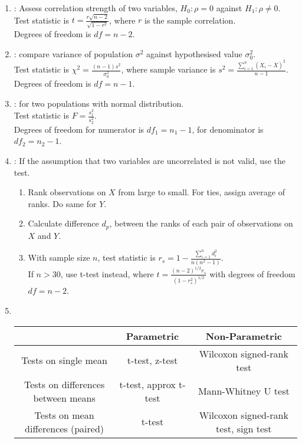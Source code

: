 \begin{method}
\begin{enumerate}[label=\roman*.]
\item {}: Assess correlation strength of two variables, $H_0: \rho = 0$ against $H_1 : \rho \neq 0$.\\
Test statistic is $t = \frac{r \sqrt{n-2}}{\sqrt{1-r^2}}$, where $r$ is the sample correlation.\\
Degrees of freedom is $df = n-2$.
\item {}: compare variance of population $\sigma^2$ against hypothesised value $\sigma_0^2$.\\
Test statistic is $\chi^2 = \frac{(n-1)s^2}{\sigma_0^2}$, where sample variance is $s^2 = \frac{\sum\limits_{i=1}^n (X_i - \overline{X})^2}{n-1}$.\\
Degrees of freedom is $df = n-1.$
\item {}: for two populations with normal distribution.\\
Test statistic is $F = \frac{s_1^2}{s_2^2}$.\\
Degrees of freedom for numerator is $df_1 = n_1 - 1$, for denominator is $df_2 = n_2 - 1$.
\item {}: If the assumption that two variables are uncorrelated is not valid, use the test.
\begin{enumerate}[label=\arabic*.]
\setlength{\itemsep}{0pt}
\item Rank observations on $X$ from large to small. For ties, assign average of ranks. Do same for $Y$.
\item Calculate difference $d_p$, between the ranks of each pair of observations on $X$ and $Y$.
\item With sample size $n$, test statistic is $r_s = 1 - \frac{\sum\limits_{i=1}^n d_i^2}{n (n^2 - 1)}$.\\
If $n>30$, use t-test instead, where $t = \frac{(n-2)^{1/2} r_s}{(1- r_s^2)^{1/2}}$ with degrees of freedom $df = n-2$.
\end{enumerate}
\item {}\\
\begin{tabular}{|c|c|c|}
\hline
\rowcolor{gray!30}
 & Parametric & Non-Parametric \\
\hline 
Tests on single mean & t-test, z-test & Wilcoxon signed-rank test \\
\hline
Tests on differences between means & t-test, approx t-test & Mann-Whitney U test \\
\hline
Tests on mean differences (paired) & t-test & Wilcoxon signed-rank test, sign test \\
\hline
\end{tabular}
\end{enumerate}
\end{method}



